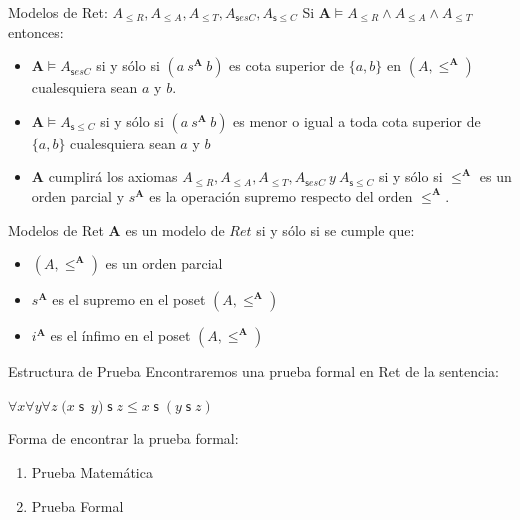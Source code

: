 \documentclass[10pt]{beamer}
\newcommand{\A}{\mathbf{A}}
\newcommand{\poset}{(A, \leq^{\mathbf{A}})}
\newcommand{\Nand}{\wedge}
\newcommand{\Nrefl}{{A}_{\leq R}}
\newcommand{\Nanti}{{A}_{\leq A}}
\newcommand{\Ntrans}{{A}_{\leq T}}
\newcommand{\NsCot}{{A}_{\mathsf{s}esC}}
\newcommand{\NsLesCot}{{A}_{\mathsf{s}\leq C}}
\newcommand{\assoc}{\forall x\forall y\forall
z\;(x\;\mathsf{s}$\ $y)\;\mathsf{s}\;z\leq x\;\mathsf{s}\;(y\;\mathsf{s}\;z)}
\begin{document}
\begin{frame}{Modelos de Ret: $\Nrefl, \Nanti, \Ntrans, \NsCot, \NsLesCot$}
  Si $ \A \models \Nrefl \Nand \Nanti \Nand \Ntrans $ entonces:
  \begin{itemize}[<+->]

    \item $\A \models \NsCot$ si y sólo si $(a\ s^{\A}\ b)$ es cota superior
    de $\{a,b\}$ en $\poset$ cualesquiera sean $a$ y $b$.
    \item $\A \models \NsLesCot$ si y sólo si $(a\ s^{\A}\ b)$
    es menor o igual a toda cota superior de $\{a,b\}$ cualesquiera sean $a$ y $b$
    \item $\A$ cumplirá los axiomas
    $\Nrefl, \Nanti, \Ntrans, \NsCot\ y\ \NsLesCot$ si y sólo si $\leq^{\A}$
    es un orden parcial y $s^{\A}$ es la operación supremo respecto del orden
    $\leq^{\A}$.
  \end{itemize}
\end{frame}


\begin{frame}{Modelos de Ret}
  $\A$ es un modelo de $Ret$ si y sólo si se cumple que:
  \begin{itemize}[<+->]
    \pause
    \item $\poset$ es un orden parcial
    \item $s^{\A}$ es el supremo en el poset $\poset$
    \item $i^{\A}$ es el ínfimo en el poset $\poset$
  \end{itemize}
\end{frame}


\begin{frame}{Estructura de Prueba}
  Encontraremos una prueba formal en Ret de la sentencia:
  \begin{center}
    $\assoc$
  \end{center}
  \pause

  Forma de encontrar la prueba formal:
  \pause
  \begin{enumerate}[<+->]

    \item Prueba Matemática
    \item Prueba Formal
  \end{enumerate}
\end{frame}
\end{document}
